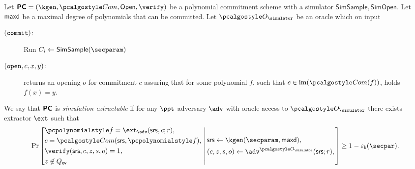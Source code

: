 \documentclass[runningheads,11pt]{llncs}
\begin{document}
\begin{definition}
  \label{def:sepcom}
  Let $\PCOM = (\kgen, \com, \open, \verify)$ be a polynomial commitment
  scheme with a simulator $\mathsf{SimSample}, \mathsf{SimOpen}$. Let $\mathsf{maxd}$ be a maximal degree of polynomials that can be
  committed.
  Let $\oracles$ be an oracle which on input
  \begin{description}
\item[$(\mathtt{commit})$:] Run $C_{i} \gets \mathsf{SimSample}(\secparam)$
  \item[$(\mathtt{open}, c, x, y)$:] returns an opening $o$ for commitment $c$
    assuring that for some polynomial $f$, such that $c \in \image(\com(f))$,
    holds $f(x) = y$.
  \end{description}
  We say that $\bm{\mathsf{PC}}$ is \emph{simulation extractable} if for any $\ppt$
  adversary $\adv$ with oracle access to $\oracles$ there exists extractor
  $\ext$ such that
\[
  \Pr \left[
    \begin{aligned}
      & \p{f} = \ext_\adv(\srs, c; r),\\
      & c = \com(\srs, \p{f}),\\
      & \verify(\srs, c, z, s, o) = 1,\\
      & z \not\in \Qev
    \end{aligned}
    \,\left|\,
      \vphantom{
        \begin{aligned}
          & \\
          & \\
          & \\
          &
        \end{aligned}
        }
    \begin{aligned}
      & \srs \gets \kgen(\secparam, \maxdeg),\\
      & (c, z, s, o) \gets \adv^{\oracles}(\srs; r), \\
    \end{aligned}
  \right.\right]
  \geq 1 - \epsk(\secpar).
\]
\end{definition}
\end{document}
